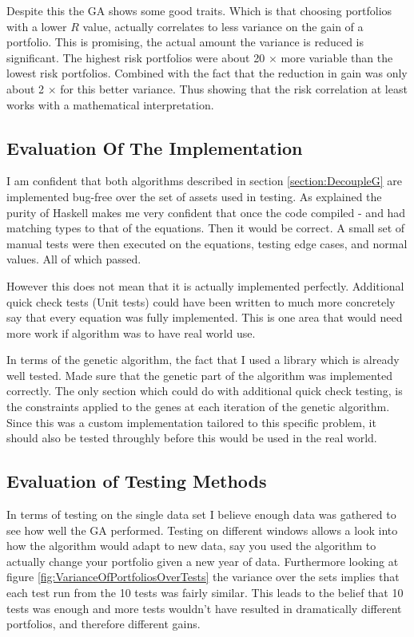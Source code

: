 \documentclass[11pt]{article}
\begin{document}
    Despite this the GA shows some good traits. Which is that choosing portfolios
    with a lower \(R\) value, actually correlates to less variance on the gain
    of a portfolio. This is promising, the actual amount the variance is reduced
    is significant. The highest risk portfolios were about 20 \(\times\) more
    variable than the lowest risk portfolios. Combined with the fact that the
    reduction in gain was only about 2 \(\times\) for this better
    variance. Thus showing that the risk correlation at least works with a mathematical
    interpretation.

\subsection{Evaluation Of The Implementation}

    I am confident that both algorithms described in section \ref{section:DecoupleG}
    are implemented bug-free over the set of assets used in testing. As explained
    the purity of Haskell makes me very confident that once the code compiled - and
    had matching types to that of the equations. Then it would be correct. A small
    set of manual tests were then executed on the equations, testing edge cases,
    and normal values. All of which passed.

    However this does not mean that it is actually implemented perfectly. Additional
    quick check tests \cite{QuickCheck} (Unit tests) could have been written to
    much more concretely say that every equation was fully implemented. This is
    one area that would need more work if algorithm was to have real world use.

    In terms of the genetic algorithm, the fact that I used a library \cite{Moo}
    which is already well tested. Made sure that the genetic part of the algorithm
    was implemented correctly. The only section which could do with additional
    quick check testing, is the constraints applied to the genes at each iteration
    of the genetic algorithm. Since this was a custom implementation tailored to
    this specific problem, it should also be tested throughly before this
    would be used in the real world.

\subsection{Evaluation of Testing Methods}

    In terms of testing on the single data set \cite{Dataset} I believe enough
    data was gathered to see how well the GA performed. Testing on different
    windows allows a look into how the algorithm would adapt to new data,
    say you used the algorithm to actually change your portfolio given a
    new year of data. Furthermore looking at figure \ref{fig:VarianceOfPortfoliosOverTests}
    the variance over the sets implies that each test run from the 10 tests was
    fairly similar. This leads to the belief that 10 tests was enough and more tests
    wouldn't have resulted in dramatically different portfolios, and therefore
    different gains.
\end{document}
